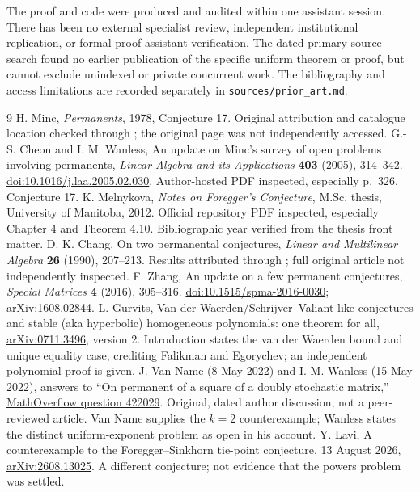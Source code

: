 \documentclass[11pt]{article}
\theoremstyle{remark}\newtheorem{remark}[theorem]{Remark}
\begin{document}
The proof and code were produced and audited within one assistant
session. There has been no external specialist review, independent
institutional replication, or formal proof-assistant verification.
The dated primary-source search found no earlier publication of the
specific uniform theorem or proof, but cannot exclude unindexed or
private concurrent work. The bibliography and access limitations are
recorded separately in \texttt{sources/prior\_art.md}.

\begin{thebibliography}{9}
 H. Minc, \emph{Permanents}, 1978, Conjecture 17.
Original attribution and catalogue location checked through
\cite{CW,Mel,Zhang}; the original page was not independently accessed.
 G.-S. Cheon and I. M. Wanless,
An update on Minc's survey of open problems involving permanents,
\emph{Linear Algebra and its Applications} \textbf{403} (2005), 314--342.
\href{https://doi.org/10.1016/j.laa.2005.02.030}{doi:10.1016/j.laa.2005.02.030}.
Author-hosted PDF inspected, especially p.~326, Conjecture 17.
 K. Melnykova, \emph{Notes on Foregger's Conjecture},
M.Sc. thesis, University of Manitoba, 2012.
Official repository PDF inspected, especially Chapter 4 and
Theorem 4.10. Bibliographic year verified from the thesis front matter.
 D. K. Chang, On two permanental conjectures,
\emph{Linear and Multilinear Algebra} \textbf{26} (1990), 207--213.
Results attributed through \cite{CW,Mel,Zhang}; full original article
not independently inspected.
 F. Zhang, An update on a few permanent conjectures,
\emph{Special Matrices} \textbf{4} (2016), 305--316.
\href{https://doi.org/10.1515/spma-2016-0030}{doi:10.1515/spma-2016-0030};
\href{https://arxiv.org/abs/1608.02844}{arXiv:1608.02844}.
 L. Gurvits, Van der Waerden/Schrijver--Valiant like
conjectures and stable (aka hyperbolic) homogeneous polynomials:
one theorem for all,
\href{https://arxiv.org/abs/0711.3496}{arXiv:0711.3496}, version 2.
Introduction states the van der Waerden bound and unique equality case,
crediting Falikman and Egorychev; an independent polynomial proof is given.
 J. Van Name (8 May 2022) and I. M. Wanless (15 May 2022),
answers to ``On permanent of a square of a doubly stochastic matrix,''
\href{https://mathoverflow.net/questions/422029/on-permanent-of-a-square-of-a-doubly-stochastic-matrix}{MathOverflow question 422029}.
Original, dated author discussion, not a peer-reviewed article.
Van Name supplies the $k=2$ counterexample; Wanless states the distinct
uniform-exponent problem as open in his account.
 Y. Lavi, A counterexample to the Foregger--Sinkhorn
tie-point conjecture, 13 August 2026,
\href{https://arxiv.org/abs/2608.13025}{arXiv:2608.13025}.
A different conjecture; not evidence that the powers problem was settled.
\end{thebibliography}
\end{document}
